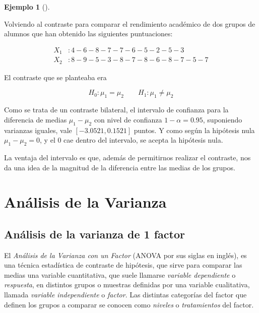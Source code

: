 \documentclass[
  a4paper,
]{scrreport}
\theoremstyle{plain}
\theoremstyle{definition}
\theoremstyle{definition}
\newtheorem{example}{Ejemplo}[chapter]
\theoremstyle{remark}
\begin{document}
\begin{example}[]\protect\hypertarget{exm-contraste-mediante-intervalos-confianza}{}\label{exm-contraste-mediante-intervalos-confianza}

Volviendo al contraste para comparar el rendimiento académico de dos
grupos de alumnos que han obtenido las siguientes puntuaciones:

\begin{align*}
X_1 &: 4 - 6 - 8 - 7 - 7 - 6 - 5 - 2 - 5 - 3  \\
X_2 &: 8 - 9 - 5 - 3 - 8 - 7 - 8 - 6 - 8 - 7 - 5 - 7
\end{align*}

El contraste que se planteaba era

\[
H_0: \mu_1=\mu_2\qquad H_1: \mu_1\neq \mu_2
\]

Como se trata de un contraste bilateral, el intervalo de confianza para
la diferencia de medias \(\mu_1-\mu_2\) con nivel de confianza
\(1-\alpha=0.95\), suponiendo varianzas iguales, vale
\([-3.0521, 0.1521]\) puntos. Y como según la hipótesis nula
\(\mu_1-\mu_2=0\), y el 0 cae dentro del intervalo, se acepta la
hipótesis nula.

La ventaja del intervalo es que, además de permitirnos realizar el
contraste, nos da una idea de la magnitud de la diferencia entre las
medias de los grupos.

\end{example}


\chapter{Análisis de la Varianza}\label{anuxe1lisis-de-la-varianza}

\section{Análisis de la varianza de 1
factor}\label{anuxe1lisis-de-la-varianza-de-1-factor}

El \emph{Análisis de la Varianza con un Factor} (ANOVA por sus siglas en
inglés), es una técnica estadística de contraste de hipótesis, que sirve
para comparar las medias una variable cuantitativa, que suele llamarse
\emph{variable dependiente} o \emph{respuesta}, en distintos grupos o
muestras definidas por una variable cualitativa, llamada \emph{variable
independiente} o \emph{factor}. Las distintas categorías del factor que
definen los grupos a comparar se conocen como \emph{niveles} o
\emph{tratamientos} del factor.
\end{document}
